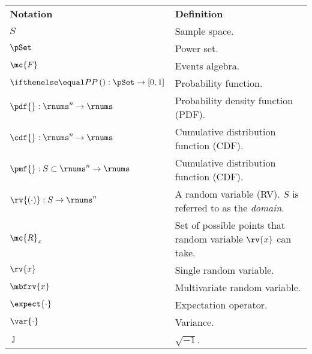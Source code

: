 \begin{table}[h]
    \centering
    \begin{tabular}{p{}p{}}
        \textbf{Notation} & \textbf{Definition}\\[5pt]
        $S$ & Sample space.\\
        $\pSet$ & Power set. \\
        $\mc{F}$ & Events algebra.\\
        $\prob{}:\pSet\to[0,1]$ & Probability function.\\
        $\pdf{}:\rnums^{n}\to\rnums$ & Probability density function (PDF).\\
        $\cdf{}:\rnums^{n}\to\rnums$ & Cumulative distribution function (CDF).\\
        $\pmf{}:S\subset\rnums^{n}\to\rnums$ & Cumulative distribution function (CDF).\\
        $\rv{(\cdot)}: S\to\rnums^{n}$& A random variable (RV). $S$ is referred to as the \emph{domain}. \\
        $\mc{R}_{x}$& Set of possible points that random variable $\rv{x}$ can take. \\
        $\rv{x}$ & Single random variable.\\
        $\mbfrv{x}$ & Multivariate random variable.   \\
        $\expect{\cdot}$ & Expectation operator.\\
        $\var{\cdot}$ & Variance.      \\
        $\jmath$ & $\sqrt{-1}$.              
    \end{tabular}
\end{table}
